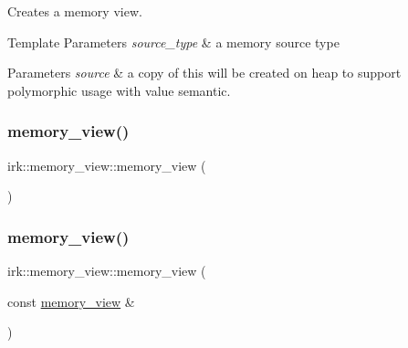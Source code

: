 Creates a memory view. 


\begin{DoxyTemplParams}{Template Parameters}
{\em source\+\_\+type} & a memory source type \\
\hline
\end{DoxyTemplParams}

\begin{DoxyParams}{Parameters}
{\em source} & a copy of this will be created on heap to support polymorphic usage with value semantic. \\
\hline
\end{DoxyParams}
\mbox{\label{classirk_1_1memory__view_a8530b1378e96dd8f82416b56248cf9b1}} 
\subsubsection{\texorpdfstring{memory\+\_\+view()}{memory\_view()}\hspace{0.1cm}{\footnotesize\ttfamily [2/4]}}
{\footnotesize\ttfamily irk\+::memory\+\_\+view\+::memory\+\_\+view (\begin{DoxyParamCaption}{ }\end{DoxyParamCaption})\hspace{0.3cm}{\ttfamily [default]}}

\mbox{\label{classirk_1_1memory__view_ac1160e860abc324f74e19fdb4eb7b6f1}} 
\subsubsection{\texorpdfstring{memory\+\_\+view()}{memory\_view()}\hspace{0.1cm}{\footnotesize\ttfamily [3/4]}}
{\footnotesize\ttfamily irk\+::memory\+\_\+view\+::memory\+\_\+view (\begin{DoxyParamCaption}\item[{const \mbox{\hyperlink{classirk_1_1memory__view}{memory\+\_\+view}} \&}]{ }\end{DoxyParamCaption})\hspace{0.3cm}{\ttfamily [default]}}

